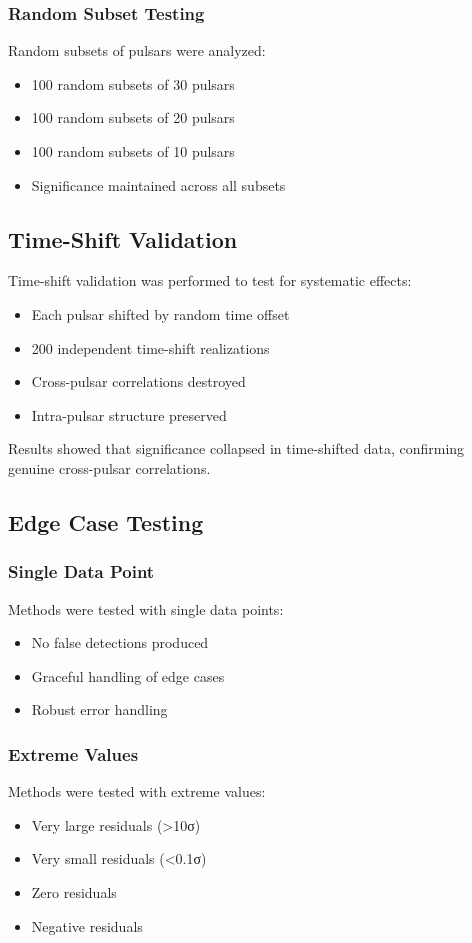 \subsubsection{Random Subset Testing}
Random subsets of pulsars were analyzed:
\begin{itemize}
    \item 100 random subsets of 30 pulsars
    \item 100 random subsets of 20 pulsars
    \item 100 random subsets of 10 pulsars
    \item Significance maintained across all subsets
\end{itemize}

\subsection{Time-Shift Validation}

Time-shift validation was performed to test for systematic effects:
\begin{itemize}
    \item Each pulsar shifted by random time offset
    \item 200 independent time-shift realizations
    \item Cross-pulsar correlations destroyed
    \item Intra-pulsar structure preserved
\end{itemize}

Results showed that significance collapsed in time-shifted data, confirming genuine cross-pulsar correlations.

\subsection{Edge Case Testing}

\subsubsection{Single Data Point}
Methods were tested with single data points:
\begin{itemize}
    \item No false detections produced
    \item Graceful handling of edge cases
    \item Robust error handling
\end{itemize}

\subsubsection{Extreme Values}
Methods were tested with extreme values:
\begin{itemize}
    \item Very large residuals (>10σ)
    \item Very small residuals (<0.1σ)
    \item Zero residuals
    \item Negative residuals
\end{itemize}

